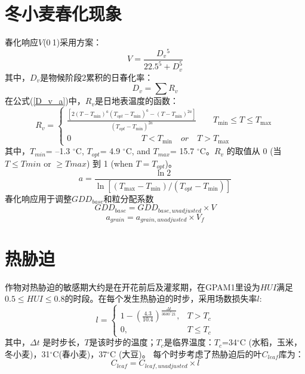 \section{冬小麦春化现象}
春化响应$V$(0$~$1)采用\citet{streck2003incorporating}方案：
\begin{equation}
V=\frac{D_{v}{ }^{5}}{22.5^{5}+D_{v}^{5}}
\end{equation}
其中，$D_v$是物候阶段2累积的日春化率：
\begin{equation}\label{D_v_a}
D_{v}=\sum R_{v}
\end{equation}
在公式(\ref{D_v_a})中，$R_{v}$是日地表温度的函数：
\begin{equation}
R_{v}=\left\{\begin{array}{c}\frac{\left[2\left(T-T_{\min }\right)^{a}\left(T_{{opt}}-T_{\min }\right)^{a}-\left(T-T_{\min }\right)^{2 a}\right]}{\left(T_{{opt}}-T_{\min }\right)^{2 a}} \ \ \ \ \ \ \ \ \    T_{\min } \leq T \leq T_{\max }\\
 0   \ \ \  \ \ \ \ \ \ \ \ \ \    \ \ \ \ \   \ \ \ \ \ \ \ \ \ \ \ \ \ \ \  \ \ \ \ \    T<T_{\min } \quad  { or } \quad T>T_{\max }
\end{array}\right.
\end{equation}
其中，$T_{min}$= –1.3 $^{\circ}$C, $T_{opt}$= 4.9 $^{\circ}$C, and $T_{max}$= 15.7 $^{\circ}$C。$ R_v$ 的取值从 0 (当$ T\leq Tmin$ or $ \geq  Tmax$) 到 1 (when $T=T_{opt}$)。
\begin{equation}
a=\frac{\ln 2}{\ln \left[\left(T_{\max }-T_{\min }\right) /\left(T_{o p t}-T_{\min }\right)\right]}
\end{equation}
春化响应用于调整$GDD_{base}$和粒分配系数
\begin{equation}
G D D_{b a s e}=G D D_{b a s e,  { unadjusted }} \times V
\end{equation}
\begin{equation}
a_{ {grain }}=a_{ {grain,unadjusted }} \times V_{f}
\end{equation}


\section{热胁迫}
作物对热胁迫的敏感期大约是在开花前后及灌浆期，在GPAM1里设为$HUI $满足$0.5 \leq HUI \leq 0.8$的时段。在每个发生热胁迫的时步，采用场数损失率$l$:
\begin{equation}
l=\left\{\begin{array}{cc}1-\left(\frac{4.3}{10.4}\right)^{\frac{\Delta t}{3600^{*} 21}}, & T>T_{c} \\ 0, & T \leq T_{c}\end{array}\right.
\end{equation}
其中，$\Delta t$ 是时步长，$T$是该时步的温度；$T_c$是临界温度：$T_c$=34$^{\circ}$C (水稻，玉米，冬小麦)，31$^{\circ}$C(春小麦)，37$^{\circ}$C (大豆)。
每个时步考虑了热胁迫后的叶$C_{leaf}$库为：
\begin{equation}
C_{leaf}=C_{leaf,  {unadjusted}} \times l
\end{equation}


